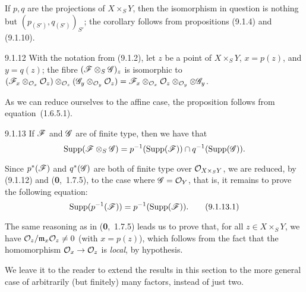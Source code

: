 \documentclass[../main.tex]{subfiles}
\begin{document}
If $p,q$ are the projections of $X\times_S Y$, then the isomorphism in question is nothing but $(p_{(S')}, q_{(S')})_{S'}$; the corollary follows from propositions (9.1.4) and (9.1.10).

\begin{cx}[Proposition]{9.1.12}
    With the notation from (9.1.2), let $z$ be a point of $X\times_S Y$, $x=p(z)$, and $y=q(z)$; the fibre $(\mathscr{F}\otimes_S\mathscr{G})_z$ is isomorphic to $(\mathscr{F}_x\otimes_{\mathcal{O}_x}\mathcal{O}_z)\otimes_{\mathcal{O}_z}(\mathscr{G}_y\otimes_{\mathcal{O}_y}\mathcal{O}_z) = \mathscr{F}_x\otimes_{\mathcal{O}_x}\mathcal{O}_z\otimes_{\mathcal{O}_y}\otimes\mathscr{G}_y$.
\end{cx}

As we can reduce ourselves to the affine case, the proposition follows from equation~(1.6.5.1).

\begin{cx}[Corollary]{9.1.13}
    If $\mathscr{F}$ and $\mathscr{G}$ are of finite type, then we have that
    \begin{equation*}
        \operatorname*{Supp}(\mathscr{F}\otimes_S\mathscr{G}) = p^{-1}(\operatorname*{Supp}(\mathscr{F}))\cap q^{-1}(\operatorname*{Supp}(\mathscr{G})).
    \end{equation*}
\end{cx}

Since $p^*(\mathscr{F})$ and $q^*(\mathscr{G})$ are both of finite type over $\mathcal{O}_{X\times_S Y}$, we are reduced, by (9.1.12) and (\textbf{0},~1.7.5), to the case where $\mathscr{G}=\mathcal{O}_Y$, that is, it remains to prove the following equation:
\begin{equation*}
    \operatorname*{Supp}(p^{-1}(\mathscr{F})) = p^{-1}(\operatorname*{Supp}(\mathscr{F})).\tag{9.1.13.1}
\end{equation*}

The same reasoning as in (\textbf{0},~1.7.5) leads us to prove that, for all $z\in X\times_S Y$, we have $\mathcal{O}_z/\mathfrak{m}_x\mathcal{O}_z\neq0$ (with $x=p(z)$), which follows from the fact that the homomorphism $\mathcal{O}_x\to\mathcal{O}_z$ is \emph{local}, by hypothesis.

We leave it to the reader to extend the results in this section to the more general case of arbitrarily (but finitely) many factors, instead of just two.
\end{document}
